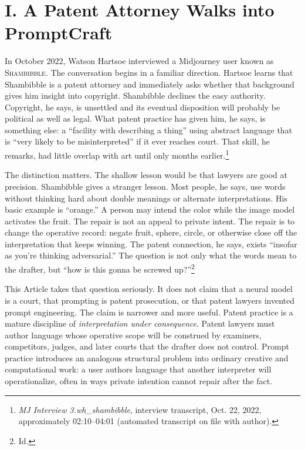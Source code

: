 \documentclass[11pt]{article}
\newcommand{\sham}{\textsc{Shambibble}\xspace}
\begin{document}
\section*{I. A Patent Attorney Walks into PromptCraft}
In October 2022, Watson Hartsoe interviewed a Midjourney user known as \sham. The conversation begins in a familiar direction. Hartsoe learns that Shambibble is a patent attorney and immediately asks whether that background gives him insight into copyright. Shambibble declines the easy authority. Copyright, he says, is unsettled and its eventual disposition will probably be political as well as legal. What patent practice has given him, he says, is something else: a ``facility with describing a thing'' using abstract language that is ``very likely to be misinterpreted'' if it ever reaches court. That skill, he remarks, had little overlap with art until only months earlier.\footnote{\emph{MJ Interview 3.wh\_shambibble}, interview transcript, Oct. 22, 2022, approximately 02:10--04:01 (automated transcript on file with author).}

The distinction matters. The shallow lesson would be that lawyers are good at precision. Shambibble gives a stranger lesson. Most people, he says, use words without thinking hard about double meanings or alternate interpretations. His basic example is ``orange.'' A person may intend the color while the image model activates the fruit. The repair is not an appeal to private intent. The repair is to change the operative record: negate fruit, sphere, circle, or otherwise close off the interpretation that keeps winning. The patent connection, he says, exists ``insofar as you're thinking adversarial.'' The question is not only what the words mean to the drafter, but ``how is this gonna be screwed up?''\footnote{Id.}

This Article takes that question seriously. It does not claim that a neural model is a court, that prompting is patent prosecution, or that patent lawyers invented prompt engineering. The claim is narrower and more useful. Patent practice is a mature discipline of \emph{interpretation under consequence}. Patent lawyers must author language whose operative scope will be construed by examiners, competitors, judges, and later courts that the drafter does not control. Prompt practice introduces an analogous structural problem into ordinary creative and computational work: a user authors language that another interpreter will operationalize, often in ways private intention cannot repair after the fact.
\end{document}

